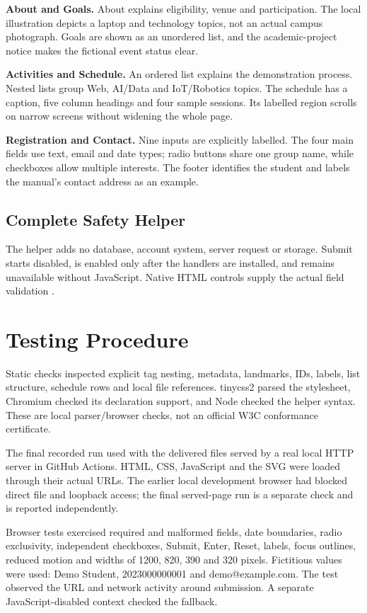 \documentclass[11pt,a4paper]{article}
\begin{document}
\textbf{About and Goals.} About explains eligibility, venue and participation. The local illustration depicts a laptop and technology topics, not an actual campus photograph. Goals are shown as an unordered list, and the academic-project notice makes the fictional event status clear.

\textbf{Activities and Schedule.} An ordered list explains the demonstration process. Nested lists group Web, AI/Data and IoT/Robotics topics. The schedule has a caption, five column headings and four sample sessions. Its labelled region scrolls on narrow screens without widening the whole page.

\textbf{Registration and Contact.} Nine inputs are explicitly labelled. The four main fields use text, email and date types; radio buttons share one group name, while checkboxes allow multiple interests. The footer identifies the student and labels the manual's contact address as an example.
\subsection{Complete Safety Helper}
The helper adds no database, account system, server request or storage. Submit starts disabled, is enabled only after the handlers are installed, and remains unavailable without JavaScript. Native HTML controls supply the actual field validation \cite{standard}.


\section{Testing Procedure}
Static checks inspected explicit tag nesting, metadata, landmarks, IDs, labels, list structure, schedule rows and local file references. tinycss2 parsed the stylesheet, Chromium checked its declaration support, and Node checked the helper syntax. These are local parser/browser checks, not an official W3C conformance certificate.

The final recorded run used \BrowserVersion{} with the delivered files served by a real local HTTP server in GitHub Actions. HTML, CSS, JavaScript and the SVG were loaded through their actual URLs. The earlier local development browser had blocked direct file and loopback access; the final served-page run is a separate check and is reported independently.

Browser tests exercised required and malformed fields, date boundaries, radio exclusivity, independent checkboxes, Submit, Enter, Reset, labels, focus outlines, reduced motion and widths of 1200, 820, 390 and 320 pixels. Fictitious values were used: Demo Student, 2023000000001 and demo@example.com. The test observed the URL and network activity around submission. A separate JavaScript-disabled context checked the fallback.
\end{document}
